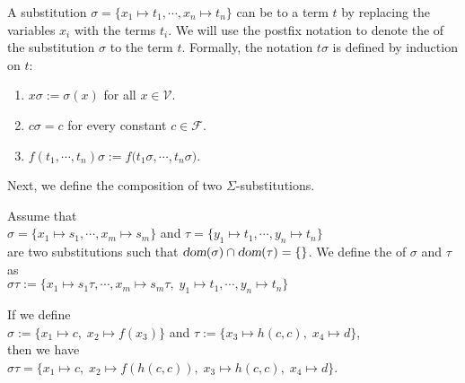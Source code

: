 A substitution $\sigma = \{ x_1 \mapsto t_1, \cdots, x_n \mapsto t_n \}$ can be  to a term $t$
by replacing the variables $x_i$ with the terms $t_i$.  We will use the postfix notation  to denote the
 of the substitution $\sigma$ to the term $t$.  Formally, the notation $t \sigma$ is defined
by induction on $t$:
\begin{enumerate}
\item $x \sigma := \sigma(x)$ \quad for all $x \in \mathcal{V}$.
\item $c \sigma = c$ \quad for every constant $c \in \mathcal{F}$.
\item $f(t_1, \cdots, t_n) \sigma := f\bigl(t_1\sigma, \cdots, t_n\sigma\bigr)$.
\end{enumerate}



Next, we define the composition of two $\Sigma$-substitutions.

\begin{Definition} 
    Assume that \\[0.2cm]
    \hspace*{1.3cm}
    $\sigma = \{ x_1 \mapsto s_1, \cdots, x_m \mapsto s_m \}$
    \quad and \quad
    $\tau = \{ y_1 \mapsto t_1, \cdots, y_n \mapsto t_n \}$
    \\[0.2cm]
    are two substitutions such that $\textsl{dom}(\sigma) \cap \textsl{dom}(\tau) = \{\}$.
    We define the    of $\sigma$ and $\tau$  as
    \\[0.2cm]
    \hspace*{1.3cm}
    $\sigma\tau := \{ x_1 \mapsto s_1\tau, \cdots, x_m \mapsto s_m\tau,\; y_1 \mapsto t_1, \cdots, y_n \mapsto t_n \}$
    \eox
\end{Definition}

\exampleEng
If we define
\\[0.2cm]
\hspace*{1.3cm}
$\sigma := \{ x_1 \mapsto c,\; x_2 \mapsto f(x_3) \}$ \quad and \quad
$\tau := \{ x_3 \mapsto h(c,c),\; x_4 \mapsto d \}$,
\\[0.2cm]
then we have
\\[0.2cm]
\hspace*{1.3cm}
$\sigma\tau = \{ x_1 \mapsto c,\; x_2 \mapsto f(h(c,c)),\; x_3 \mapsto h(c,c),\;x_4 \mapsto d \}$.
\eox
\vspace{0.3cm}


